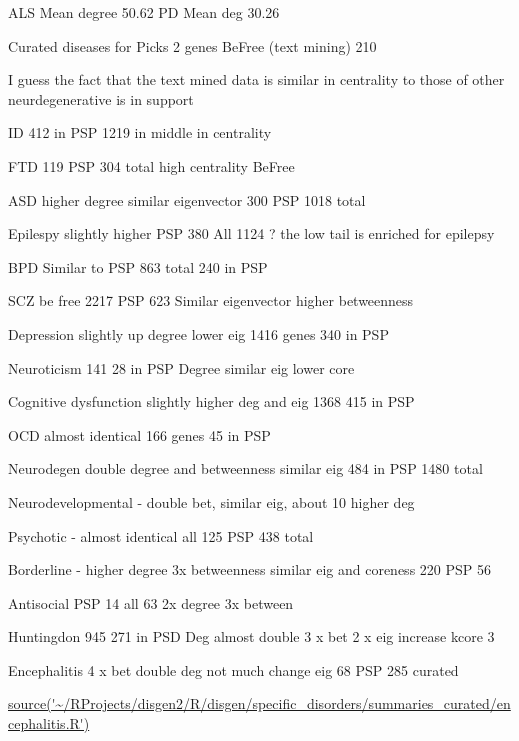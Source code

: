 ALS Mean degree 50.62
PD Mean deg 30.26


Curated diseases for Picks 2 genes BeFree (text mining) 210

I guess the fact that the text mined data is similar in centrality to those of other neurdegenerative is in support


ID 412 in PSP 1219 in middle in centrality 

FTD 119 PSP 304 total  high centrality BeFree

ASD higher degree similar eigenvector 300 PSP 1018 total

Epilespy slightly higher PSP 380 All 1124 ? the low tail is enriched for epilepsy

BPD Similar to PSP 863 total 240 in PSP

SCZ be free 2217 PSP 623 Similar eigenvector higher betweenness

Depression slightly up degree lower eig 1416 genes 340 in PSP

Neuroticism 141 28 in PSP
Degree similar eig lower core

Cognitive dysfunction slightly higher deg and eig 1368 415 in PSP

OCD almost identical 166 genes 45 in PSP

Neurodegen double degree and betweenness similar eig 484 in PSP 1480 total

Neurodevelopmental - double bet, similar eig, about 10 higher deg

Psychotic - almost identical all 125 PSP 438 total

Borderline - higher degree 3x betweenness similar eig and coreness 220 PSP 56

Antisocial PSP 14 all 63
2x degree 3x between

Huntingdon 945 271 in PSD 
Deg almost double 3 x bet 2 x eig  increase kcore 3

Encephalitis
4 x bet double deg not much change eig 68 PSP 285 curated 

\url{source('~/RProjects/disgen2/R/disgen/specific_disorders/summaries_curated/encephalitis.R')}




